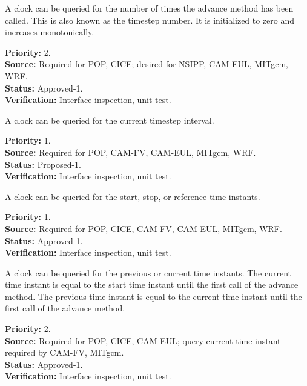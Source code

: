
A clock can be queried for the number of times the advance method has
been called.  This is also known as the timestep number.  It is initialized to 
zero and increases monotonically.
\begin{reqlist}
{\bf Priority:} 2. \\
{\bf Source:} Required for POP, CICE; desired for NSIPP, CAM-EUL, MITgcm, WRF. \\
{\bf Status:} Approved-1. \\
{\bf Verification:} Interface inspection, unit test. 
\end{reqlist}

A clock can be queried for the current timestep interval.
\begin{reqlist}
{\bf Priority:} 1. \\
{\bf Source:} Required for POP, CAM-FV, CAM-EUL, MITgcm, WRF. \\
{\bf Status:} Proposed-1. \\
{\bf Verification:} Interface inspection, unit test. 
\end{reqlist}

A clock can be queried for the start, stop, or reference time instants.
\begin{reqlist}
{\bf Priority:} 1. \\
{\bf Source:} Required for POP, CICE, CAM-FV, CAM-EUL, MITgcm, WRF. \\
{\bf Status:} Approved-1. \\
{\bf Verification:} Interface inspection, unit test. 
\end{reqlist}

A clock can be queried for the previous or current time instants.
The current time instant is equal to the start time
instant until the first call of the advance method.
The previous time instant is equal to the current time
instant until the first call of the advance method.
\begin{reqlist}
{\bf Priority:} 2. \\
{\bf Source:} Required for POP, CICE, CAM-EUL; query current time instant required by CAM-FV, MITgcm. \\
{\bf Status:} Approved-1. \\
{\bf Verification:} Interface inspection, unit test. 
\end{reqlist}

